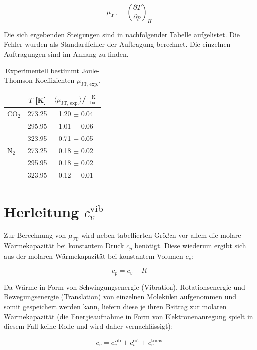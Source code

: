 \documentclass[a4paper,12pt,oneside,onecolum,final,openany]{report}
\begin{document}
\begin{equation}
\mu_\mathrm{JT} = \left(\frac{\partial T}{\partial p}\right)_H
\end{equation}

Die sich ergebenden Steigungen sind in nachfolgender Tabelle aufgelistet. Die Fehler wurden als Standardfehler der Auftragung berechnet. Die einzelnen Auftragungen sind im Anhang zu finden.\\

\begin{table} [h]
\centering
\caption{Experimentell bestimmt Joule-Thomson-Koeffizienten $\mu_{\text{JT, exp.}}$.}
\begin{tabular} {l | c|  c}
	 &  $T$ [K] & $\langle \mu_{\text{JT, exp.}} \rangle$/~$\frac{\mathrm{K}}{\mathrm{bar}}$ \\
	 \hline
	  $\mathrm{CO}_\mathrm{2}$ & 273.25 & 1.20 $\pm$ 0.04 \\
	   & 295.95 & 1.01 $\pm$ 0.06\\
	  & 323.95 & 0.71 $\pm$ 0.05\\
	\hline
	$\mathrm{N}_2$ & 273.25 & 0.18  $\pm$  0.02\\
	& 295.95 & 0.18 $\pm$ 0.02\\
	& 323.95& 0.12 $\pm$ 0.01\\
\end{tabular}
\end{table}
\section{Herleitung $c_v^\mathrm{ vib}$}

Zur Berechnung von $\mu_\mathrm{JT}$ wird neben tabellierten Größen vor allem die molare Wärmekapazität bei konstantem Druck $c_p$ benötigt. Diese wiederum ergibt sich aus der molaren Wärmekapazität bei konstantem Volumen $c_v$:

\begin{equation}
c_p = c_v +R \label{cpauscv}
\end{equation}

Da Wärme in Form von Schwingungsenergie (Vibration), Rotationsenergie und Bewegungsenergie (Translation) von einzelnen Molekülen aufgenommen und somit gespeichert werden kann, liefern diese je ihren Beitrag zur molaren Wärmekapazität (die Energieaufnahme in Form von Elektronenanregung spielt in diesem Fall keine Rolle und wird daher vernachlässigt):

\begin{equation}
c_v = c_v^\mathrm{ vib} + c_v^\mathrm{ rot} + c_v^\mathrm{trans}  
\label{cv=rotvibtrans}
\end{equation}
\end{document}
